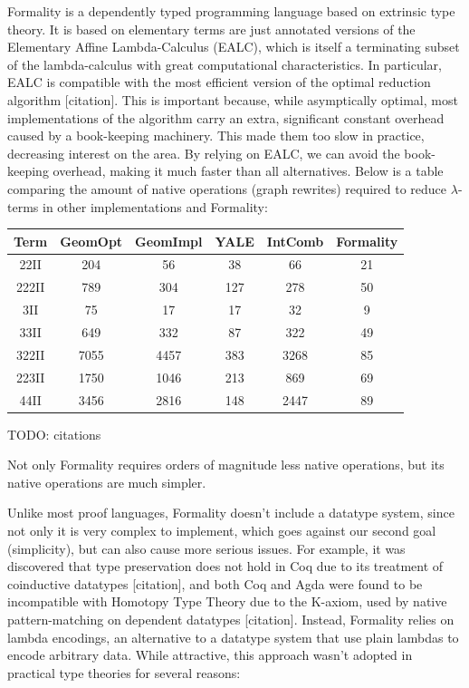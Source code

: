 \documentclass{article}
\theoremstyle{definition}
\theoremstyle{theorem}
\begin{document}
Formality is a dependently typed programming language based on extrinsic type
theory. It is based on elementary terms are just annotated versions of the
Elementary Affine Lambda-Calculus (EALC), which is itself a terminating subset
of the lambda-calculus with great computational characteristics. In particular,
EALC is compatible with the most efficient version of the optimal reduction
algorithm [citation]. This is important because, while asymptically optimal,
most implementations of the algorithm carry an extra, significant constant
overhead caused by a book-keeping machinery. This made them too slow in
practice, decreasing interest on the area. By relying on EALC, we can avoid the
book-keeping overhead, making it much faster than all alternatives. Below is a
table comparing the amount of native operations (graph rewrites) required to
reduce $\lambda$-terms in other implementations and Formality:

 \begin{tabular}{ c | c | c | c | c | c}
Term & GeomOpt & GeomImpl & YALE & IntComb & Formality \\\hline
 22II &     204 &       56 &   38 &      66 &        21\\
222II &     789 &      304 &  127 &     278 &        50\\
  3II &      75 &       17 &   17 &      32 &         9\\
 33II &     649 &      332 &   87 &     322 &        49\\
322II &    7055 &     4457 &  383 &    3268 &        85\\
223II &    1750 &     1046 &  213 &     869 &        69\\
 44II &    3456 &     2816 &  148 &    2447 &        89\\
\end{tabular}

TODO: citations

Not only Formality requires orders of magnitude less native operations, but its
native operations are much simpler.

Unlike most proof languages, Formality doesn't include a datatype system, since
not only it is very complex to implement, which goes against our second goal
(simplicity), but can also cause more serious issues. For example, it was
discovered that type preservation does not hold in Coq due to its treatment of
coinductive datatypes [citation], and both Coq and Agda were found to be
incompatible with Homotopy Type Theory due to the K-axiom, used by native
pattern-matching on dependent datatypes [citation]. Instead, Formality relies on
lambda encodings, an alternative to a datatype system that use plain lambdas to
encode arbitrary data. While attractive, this approach wasn't adopted in
practical type theories for several reasons:
\end{document}
